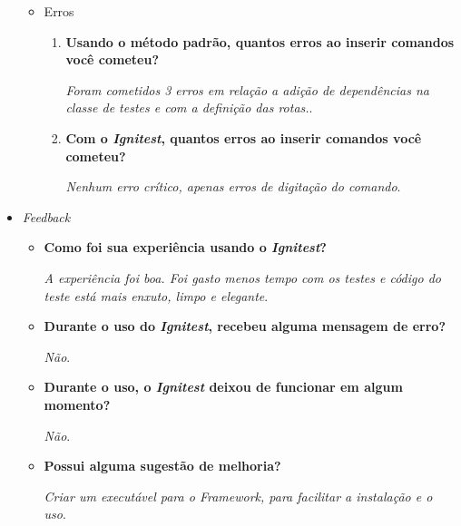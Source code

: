 \begin{itemize}
\begin{itemize}
                \item Erros
                    \begin{enumerate}
                        \item \textbf{Usando o método padrão, quantos erros ao inserir comandos você cometeu?}
                        
			  \subitem \textit{Foram cometidos 3 erros em relação a adição de dependências na classe de testes e
				    com a definição das rotas.}.
			  
                        \item \textbf{Com o \textit{Ignitest}, quantos erros ao inserir comandos você cometeu?}
			  
			  \subitem \textit{Nenhum erro crítico, apenas erros de digitação do comando}.
                    \end{enumerate}
            \end{itemize}
        
        \item \textit{Feedback}
            \begin{itemize}
                \item \textbf{Como foi sua experiência usando o \textit{Ignitest}?}
		    
		   \subitem \textit{A experiência foi boa. Foi gasto menos tempo com os testes e código do teste está mais
			    enxuto, limpo e elegante}.
		  
                \item \textbf{Durante o uso do \textit{Ignitest}, recebeu alguma mensagem de erro?}
                
		   \subitem \textit{Não}.
		   
                \item \textbf{Durante o uso, o \textit{Ignitest} deixou de funcionar em algum momento?}
                
		   \subitem \textit{Não}.
		   
                \item \textbf{Possui alguma sugestão de melhoria?}
                
		   \subitem \textit{Criar um executável para o Framework, para facilitar a instalação e o uso}.
            \end{itemize}
    \end{itemize}